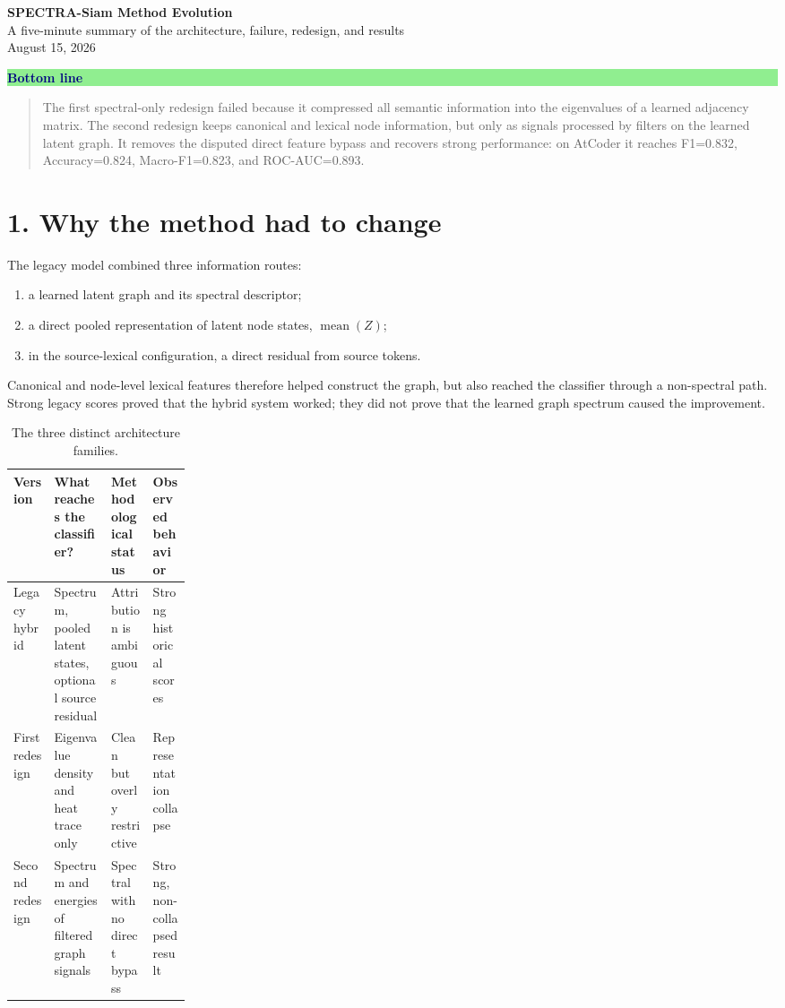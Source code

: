 \documentclass[10pt,a4paper]{article}
\newenvironment{summarybox}[2]{%
  \begin{center}\begin{minipage}{0.95\linewidth}
  \colorbox{#1}{\parbox{0.96\linewidth}{\textcolor{navy}{\textbf{#2}}\par\smallskip}}
  \vspace{-6pt}\begin{quote}
}{\end{quote}\end{minipage}\end{center}}
\begin{document}
\begin{center}
{\LARGE\bfseries SPECTRA-Siam Method Evolution}\\[2mm]
{\large A five-minute summary of the architecture, failure, redesign, and results}\\[2mm]
{\small August 15, 2026}
\end{center}

\begin{summarybox}{lightgreen}{Bottom line}
The first spectral-only redesign failed because it compressed all semantic
information into the eigenvalues of a learned adjacency matrix. The second
redesign keeps canonical and lexical node information, but only as signals
processed by filters on the learned latent graph. It removes the disputed
direct feature bypass and recovers strong performance: on AtCoder it reaches
F1=0.832, Accuracy=0.824, Macro-F1=0.823, and ROC-AUC=0.893.
\end{summarybox}

\section*{1. Why the method had to change}

The legacy model combined three information routes:
\begin{enumerate}
\item a learned latent graph and its spectral descriptor;
\item a direct pooled representation of latent node states, $\operatorname{mean}(Z)$;
\item in the source-lexical configuration, a direct residual from source tokens.
\end{enumerate}
Canonical and node-level lexical features therefore helped construct the graph,
but also reached the classifier through a non-spectral path. Strong legacy
scores proved that the hybrid system worked; they did not prove that the
learned graph spectrum caused the improvement.

\begin{table}[H]
\centering
\small
\begin{tabularx}{\linewidth}{p{0.23\linewidth}XXX}
\toprule
Version & What reaches the classifier? & Methodological status & Observed behavior \\
\midrule
Legacy hybrid & Spectrum, pooled latent states, optional source residual & Attribution is ambiguous & Strong historical scores \\
First redesign & Eigenvalue density and heat trace only & Clean but overly restrictive & Representation collapse \\
Second redesign & Spectrum and energies of filtered graph signals & Spectral with no direct bypass & Strong, non-collapsed result \\
\bottomrule
\end{tabularx}
\caption{The three distinct architecture families.}
\end{table}
\end{document}
